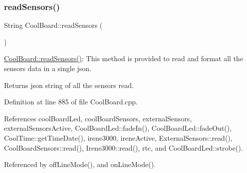 \subsubsection{\texorpdfstring{read\+Sensors()}{readSensors()}}
{\footnotesize\ttfamily String Cool\+Board\+::read\+Sensors (\begin{DoxyParamCaption}{ }\end{DoxyParamCaption})}

\hyperlink{classCoolBoard_ad03abdce2e65f520bbf2cff0f2d083cf}{Cool\+Board\+::read\+Sensors()}\+: This method is provided to read and format all the sensors data in a single json.

\begin{DoxyReturn}{Returns}
json string of all the sensors read. 
\end{DoxyReturn}


Definition at line 885 of file Cool\+Board.\+cpp.



References cool\+Board\+Led, cool\+Board\+Sensors, external\+Sensors, external\+Sensors\+Active, Cool\+Board\+Led\+::fade\+In(), Cool\+Board\+Led\+::fade\+Out(), Cool\+Time\+::get\+Time\+Date(), irene3000, irene\+Active, External\+Sensors\+::read(), Cool\+Board\+Sensors\+::read(), Irene3000\+::read(), rtc, and Cool\+Board\+Led\+::strobe().



Referenced by off\+Line\+Mode(), and on\+Line\+Mode().


